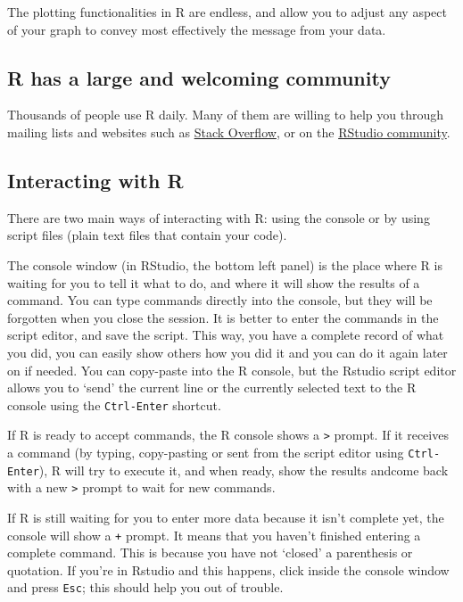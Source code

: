 \documentclass[]{book}
\begin{document}
The plotting functionalities in R are endless, and allow you to adjust any aspect of your graph to convey most effectively the message from your data.

\hypertarget{r-has-a-large-and-welcoming-community}{%
\subsection*{R has a large and welcoming community}\label{r-has-a-large-and-welcoming-community}}

Thousands of people use R daily. Many of them are willing to help you through mailing lists and websites such as \href{https://stackoverflow.com}{Stack Overflow}, or on the \href{https://community.rstudio.com/}{RStudio community}.

\hypertarget{interacting-with-r}{%
\subsection*{Interacting with R}\label{interacting-with-r}}

There are two main ways of interacting with R: using the console or by using
script files (plain text files that contain your code).

The console window (in RStudio, the bottom left panel) is the place where R is waiting for you to tell it what to do, and where it will show the results of a command. You can type commands directly into the console, but they will be forgotten when you close the session. It is better to enter the commands in the script editor, and save the script. This way, you have a complete record of what you did, you can easily show others how you did it and you can do it again later on if needed. You can copy-paste into the R console, but the Rstudio script editor allows you to `send' the current line or the currently selected text to the R console using the \texttt{Ctrl-Enter} shortcut.

If R is ready to accept commands, the R console shows a \texttt{\textgreater{}} prompt. If it receives a command (by typing, copy-pasting or sent from the script editor using \texttt{Ctrl-Enter}), R will try to execute it, and when ready, show the results andcome back with a new \texttt{\textgreater{}} prompt to wait for new commands.

If R is still waiting for you to enter more data because it isn't complete yet, the console will show a \texttt{+} prompt. It means that you haven't finished entering a complete command. This is because you have not `closed' a parenthesis or quotation. If you're in Rstudio and this happens, click inside the console window and press \texttt{Esc}; this should help you out of trouble.
\end{document}
